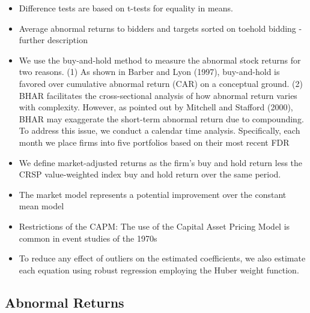 \documentclass[12pt]{article}
\begin{document}
\begin{itemize}
        \item Difference tests are based on t-tests for equality in means. \citep{Moeller2004}

        \item Average abnormal returns to bidders and targets sorted on toehold bidding - further description \citep{Betton2009}

        \item We use the buy-and-hold method to measure the abnormal stock returns for two reasons. (1) As shown in Barber and Lyon (1997), buy-and-hold is favored over cumulative abnormal return (CAR) on a conceptual ground. (2) BHAR facilitates the cross-sectional analysis of how abnormal return varies with complexity. However, as pointed out by Mitchell and Stafford (2000), BHAR may exaggerate the short-term abnormal return due to compounding. To address this issue, we conduct a calendar time analysis. Specifically, each month we place firms into five portfolios based on their most recent FDR \citep{You2009}
        
        \item We define market-adjusted returns as the firm’s buy and hold return less the CRSP value-weighted index buy and hold return over the same period. \citep{Choi2012}

        \item The market model represents a potential improvement over the constant mean model \citep{MacKinlay1997}

        \item Restrictions of the CAPM: The use of the Capital Asset Pricing Model is common in event studies of the 1970s \citep{MacKinlay1997} 

        \item To reduce any effect of outliers on the estimated coefficients, we also estimate each equation using robust regression employing the Huber weight function. \citep{Brigida2012}

        
    \end{itemize}

\subsection{Abnormal Returns}
\end{document}
